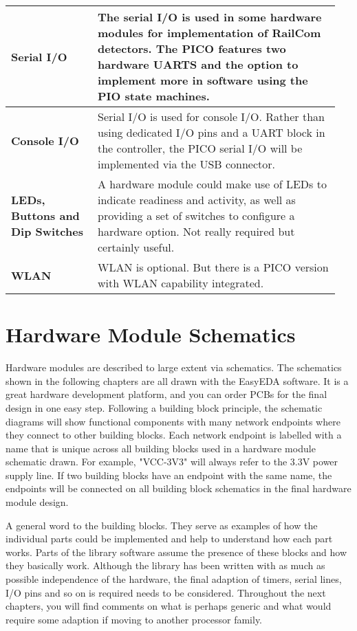 \begin{longtable}{@{}p{0.25\linewidth}p{0.7\linewidth}@{}}
    \midrule
    \textbf{Serial I/O} & The serial I/O is used in some hardware modules for implementation of RailCom detectors. The PICO features two hardware UARTS and the option to implement more in software using the PIO state machines. \\
    \midrule
    \textbf{Console I/O} & Serial I/O is used for console I/O. Rather than using dedicated I/O pins and a UART block in the controller, the PICO serial I/O will be implemented via the USB connector. \\
    \textbf{LEDs, Buttons and Dip Switches} & A hardware module could make use of LEDs to indicate readiness and activity, as well as providing a set of switches to configure a hardware option. Not really required but certainly useful. \\
    \midrule
    \textbf{WLAN} & WLAN is optional. But there is a PICO version with WLAN capability integrated. \\
\end{longtable}

\section{Hardware Module Schematics}

Hardware modules are described to large extent via schematics. The schematics shown in the following chapters are all drawn with the EasyEDA software. It is a great hardware development platform, and you can order PCBs for the final design in one easy step. Following a building block principle, the schematic diagrams will show functional components with many network endpoints where they connect to other building blocks. Each network endpoint is labelled with a name that is unique across all building blocks used in a hardware module schematic drawn. For example, "VCC-3V3" will always refer to the 3.3V power supply line. If two building blocks have an endpoint with the same name, the endpoints will be connected on all building block schematics in the final hardware module design.

A general word to the building blocks. They serve as examples of how the individual parts could be implemented and help to understand how each part works. Parts of the library software assume the presence of these blocks and how they basically work. Although the library has been written with as much as possible independence of the hardware, the final adaption of timers, serial lines, I/O pins and so on is required needs to be considered. Throughout the next chapters, you will find comments on what is perhaps generic and what would require some adaption if moving to another processor family.

